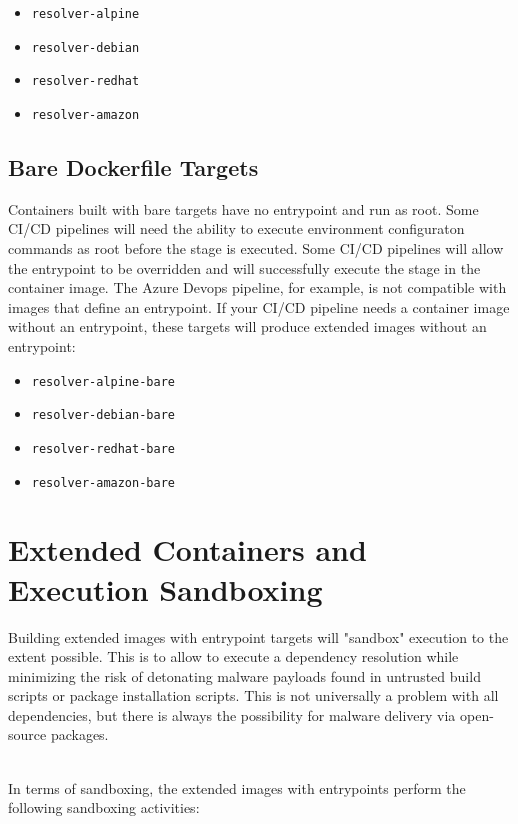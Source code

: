 \begin{itemize}
    \item \texttt{resolver-alpine}
    \item \texttt{resolver-debian}
    \item \texttt{resolver-redhat}
    \item \texttt{resolver-amazon}
\end{itemize}


\subsection{Bare Dockerfile Targets}\label{ssec:bare_targets}

Containers built with bare targets have no entrypoint and run as root.  
Some CI/CD pipelines will need the ability to execute environment
configuraton commands as root before the stage is executed.  Some CI/CD pipelines
will allow the entrypoint to be overridden and will successfully execute the stage
in the container image.  The Azure Devops pipeline, for example, is not compatible
with images that define an entrypoint.  If your CI/CD pipeline needs a container image without 
an entrypoint, these targets will
produce extended images without an entrypoint:

\begin{itemize}
    \item \texttt{resolver-alpine-bare}
    \item \texttt{resolver-debian-bare}
    \item \texttt{resolver-redhat-bare}
    \item \texttt{resolver-amazon-bare}
\end{itemize}


\section{Extended Containers and Execution Sandboxing}

Building extended images with entrypoint targets will "sandbox" \scaresolver execution 
to the extent possible. This is to allow \scaresolver to execute a dependency resolution
while minimizing the risk of detonating malware payloads found in untrusted build scripts or 
package installation scripts. This is not universally a problem with all dependencies, but 
there is always the possibility for malware delivery via open-source packages. 

\noindent\\In terms of sandboxing, the extended images with entrypoints perform the following sandboxing
activities:

